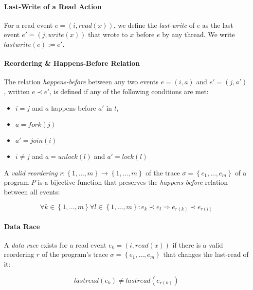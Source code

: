 \documentclass[a4paper,UKenglish,cleveref, autoref, thm-restate]{lipics-v2021}
\begin{document}
\paragraph*{Last-Write of a Read Action}

For a read event $e = (i, read(x))$, we define the \textit{last-write} of $e$ as the last event $e' = (j, write(x))$ that wrote to $x$ before $e$ by any thread. We write $lastwrite(e) := e'$.

\paragraph*{Reordering \& Happens-Before Relation}

The relation \textit{happens-before} between any two events $e=(i, a)$ and $e'=(j, a')$, written $e \prec e'$, is defined if any of the following conditions are met:

\begin{itemize}
    \item $i = j$ and $a$ happens before $a'$ in $t_i$
    \item $a = fork(j)$
    \item $a' = join(i)$
    \item $i \neq j$ and $a = unlock(l)$ and $a' = lock(l)$
\end{itemize}


A \textit{valid reordering} $r : \left\{1,...,m\right\} \rightarrow \left\{1,...,m\right\}$ of the trace $\sigma = \left\{e_1, ..., e_m\right\}$ of a program $P$ is a bijective function that preserves the \textit{happens-before} relation between all events:

$$
    \forall k \in \left\{1,...,m\right\} \forall l \in \left\{1,...,m\right\}: e_k \prec e_l \Rightarrow e_{r(k)} \prec e_{r(l)}
$$

\paragraph*{Data Race}

A \textit{data race} exists for a read event $e_k = (i, read(x))$ if there is a valid reordering $r$ of the program's trace $\sigma = \left\{e_1, ..., e_m\right\}$ that changes the last-read of it:

$$
    lastread(e_k) \neq lastread(e_{r(k)})
$$




% 

\end{document}
